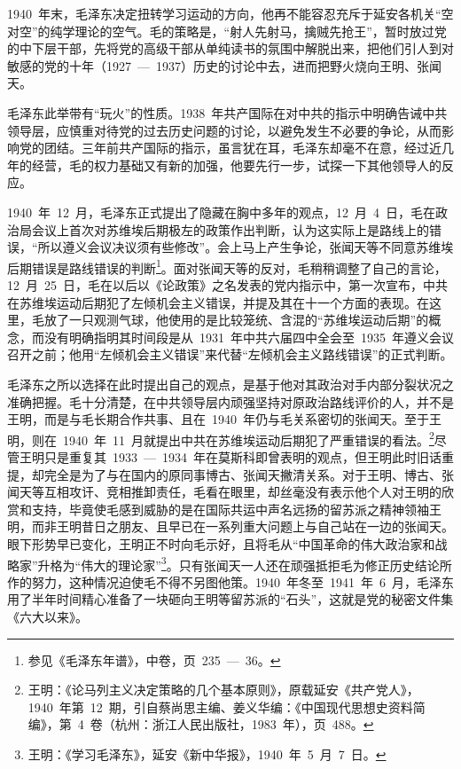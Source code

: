 1940~年末，毛泽东决定扭转学习运动的方向，他再不能容忍充斥于延安各机关“空对空”的纯学理论的空气。毛的策略是，“射人先射马，擒贼先抢王”，暂时放过党的中下层干部，先将党的高级干部从单纯读书的氛围中解脱出来，把他们引人到对敏感的党的十年（1927~—~1937）历史的讨论中去，进而把野火烧向王明、张闻天。

毛泽东此举带有“玩火”的性质。1938~年共产国际在对中共的指示中明确告诫中共领导层，应慎重对待党的过去历史问题的讨论，以避免发生不必要的争论，从而影响党的团结。三年前共产国际的指示，虽言犹在耳，毛泽东却毫不在意，经过近几年的经营，毛的权力基础又有新的加强，他要先行一步，试探一下其他领导人的反应。

1940~年~12~月，毛泽东正式提出了隐藏在胸中多年的观点，12~月~4~日，毛在政治局会议上首次对苏维埃后期极左的政策作出判断，认为这实际上是路线上的错误，“所以遵义会议决议须有些修改”。会上马上产生争论，张闻天等不同意苏维埃后期错误是路线错误的判断\footnote{参见《毛泽东年谱》，中卷，页~235~—~36。}。面对张闻天等的反对，毛稍稍调整了自己的言论，12~月~25~日，毛在以后以《论政策》之名发表的党内指示中，第一次宣布，中共在苏维埃运动后期犯了左倾机会主义错误，并提及其在十一个方面的表现。在这里，毛放了一只观测气球，他使用的是比较笼统、含混的“苏维埃运动后期”的概念，而没有明确指明其时间段是从~1931~年中共六届四中全会至~1935~年遵义会议召开之前；他用“左倾机会主义错误”来代替“左倾机会主义路线错误”的正式判断。

毛泽东之所以选择在此时提出自己的观点，是基于他对其政治对手内部分裂状况之准确把握。毛十分清楚，在中共领导层内顽强坚持对原政治路线评价的人，并不是王明，而是与毛长期合作共事、且在~1940~年仍与毛关系密切的张闻天。至于王明，则在~1940~年~11~月就提出中共在苏维埃运动后期犯了严重错误的看法。\footnote{王明：《论马列主义决定策略的几个基本原则》，原载延安《共产党人》，1940~年第~12~期，引自蔡尚思主编、姜义华编：《中国现代思想史资料简编》，第~4~卷（杭州：浙江人民出版社，1983~年），页~488。}尽管王明只是重复其~1933~—~1934~年在莫斯科即曾表明的观点，但王明此时旧话重提，却完全是为了与在国内的原同事博古、张闻天撇清关系。对于王明、博古、张闻天等互相攻讦、竞相推卸责任，毛看在眼里，却丝毫没有表示他个人对王明的欣赏和支持，毕竟使毛感到威胁的是在国际共运中声名远扬的留苏派之精神领袖王明，而非王明昔日之朋友、且早已在一系列重大问题上与自己站在一边的张闻天。眼下形势早已变化，王明正不时向毛示好，且将毛从“中国革命的伟大政治家和战略家”升格为“伟大的理论家”\footnote{王明：《学习毛泽东》，延安《新中华报》，1940~年~5~月~7~日。}。只有张闻天一人还在顽强抵拒毛为修正历史结论所作的努力，这种情况迫使毛不得不另图他策。1940~年冬至~1941~年~6~月，毛泽东用了半年时间精心准备了一块砸向王明等留苏派的“石头”，这就是党的秘密文件集《六大以来》。

